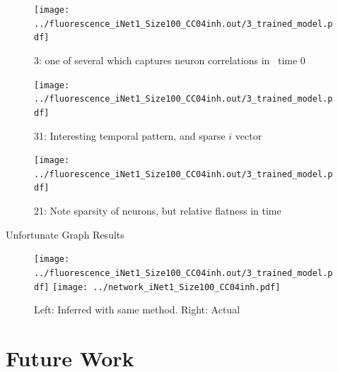 \documentclass{article}
\begin{document}
\begin{figure}[!h]
\centering
\texttt{[image: ../fluorescence\_iNet1\_Size100\_CC04inh.out/3\_trained\_model.pdf]}
\caption{3: one of several which captures neuron correlations in ~time 0}
\end{figure}

\begin{figure}[!h]
\centering
\texttt{[image: ../fluorescence\_iNet1\_Size100\_CC04inh.out/3\_trained\_model.pdf]}
\caption{31: Interesting temporal pattern, and sparse $i$ vector}
\end{figure}

\begin{figure}[!h]
\centering
\texttt{[image: ../fluorescence\_iNet1\_Size100\_CC04inh.out/3\_trained\_model.pdf]}
\caption{21: Note sparsity  of neurons, but relative flatness in time}
\end{figure}

Unfortunate Graph Results
\begin{figure}[h]
\centering
\texttt{[image: ../fluorescence\_iNet1\_Size100\_CC04inh.out/3\_trained\_model.pdf]}
\hfill
\texttt{[image: ../network\_iNet1\_Size100\_CC04inh.pdf]}
\caption{Left: Inferred with same method. Right: Actual}
\end{figure}

\section{Future Work}
\label{sec:future}

\newpage

\end{document}
